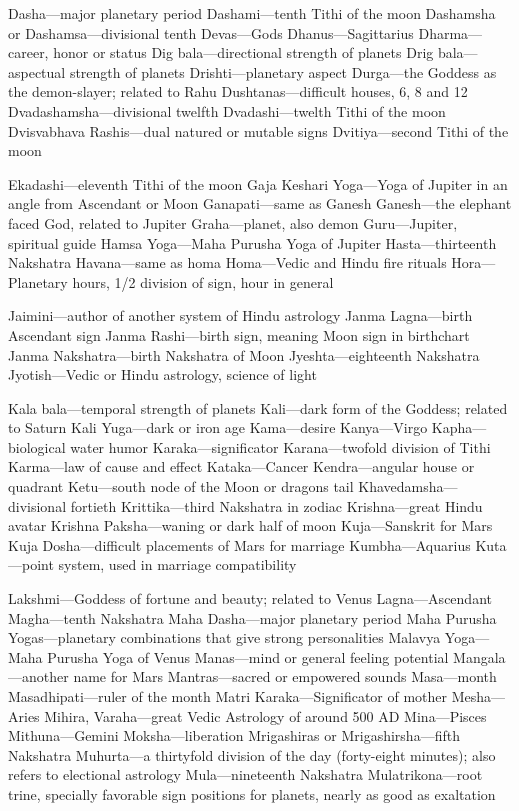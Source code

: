 Dasha—major planetary period Dashami—tenth Tithi of the moon Dashamsha or Dashamsa—divisional tenth Devas—Gods Dhanus—Sagittarius Dharma—career, honor or status Dig bala—directional strength of planets Drig bala—aspectual strength of planets Drishti—planetary aspect Durga—the Goddess as the demon-slayer; related to Rahu Dushtanas—difficult houses, 6, 8 and 12 Dvadashamsha—divisional twelfth Dvadashi—twelth Tithi of the moon Dvisvabhava Rashis—dual natured or mutable signs Dvitiya—second Tithi of the moon  

Ekadashi—eleventh Tithi of the moon Gaja Keshari Yoga—Yoga of Jupiter in an angle from Ascendant or Moon Ganapati—same as Ganesh Ganesh—the elephant faced God, related to Jupiter Graha—planet, also demon Guru—Jupiter, spiritual guide   Hamsa Yoga—Maha Purusha Yoga of Jupiter Hasta—thirteenth Nakshatra Havana—same as homa Homa—Vedic and Hindu fire rituals Hora—Planetary hours, 1/2 division of sign, hour in general  

Jaimini—author of another system of Hindu astrology Janma Lagna—birth Ascendant sign Janma Rashi—birth sign, meaning Moon sign in birthchart Janma Nakshatra—birth Nakshatra of Moon Jyeshta—eighteenth Nakshatra Jyotish—Vedic or Hindu astrology, science of light  

Kala bala—temporal strength of planets Kali—dark form of the Goddess; related to Saturn Kali Yuga—dark or iron age Kama—desire Kanya—Virgo Kapha—biological water humor Karaka—significator Karana—twofold division of Tithi Karma—law of cause and effect Kataka—Cancer Kendra—angular house or quadrant Ketu—south node of the Moon or dragons tail Khavedamsha—divisional fortieth Krittika—third Nakshatra in zodiac Krishna—great Hindu avatar Krishna Paksha—waning or dark half of moon Kuja—Sanskrit for Mars Kuja Dosha—difficult placements of Mars for marriage Kumbha—Aquarius Kuta—point system, used in marriage compatibility

Lakshmi—Goddess of fortune and beauty; related to Venus Lagna—Ascendant   Magha—tenth Nakshatra Maha Dasha—major planetary period Maha Purusha Yogas—planetary combinations that give strong personalities Malavya Yoga—Maha Purusha Yoga of Venus Manas—mind or general feeling potential Mangala—another name for Mars Mantras—sacred or empowered sounds Masa—month Masadhipati—ruler of the month Matri Karaka—Significator of mother Mesha—Aries Mihira, Varaha—great Vedic Astrology of around 500 AD Mina—Pisces Mithuna—Gemini Moksha—liberation Mrigashiras or Mrigashirsha—fifth Nakshatra Muhurta—a thirtyfold division of the day (forty-eight minutes); also refers to electional astrology Mula—nineteenth Nakshatra Mulatrikona—root trine, specially favorable sign positions for planets, nearly as good as exaltation

